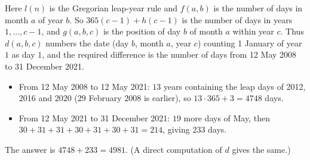 Here $l(n)$ is the Gregorian leap-year rule and $f(a,b)$ is the number of days in month $a$ of year $b$. So $365(c-1)+h(c-1)$ is the number of days in years $1,\dots,c-1$, and $g(a,b,c)$ is the position of day $b$ of month $a$ within year $c$. Thus $d(a,b,c)$ numbers the date (day $b$, month $a$, year $c$) counting 1 January of year $1$ as day $1$, and the required difference is the number of days from 12 May 2008 to 31 December 2021.
\begin{itemize}
\item From 12 May 2008 to 12 May 2021: $13$ years containing the leap days of 2012, 2016 and 2020 (29 February 2008 is earlier), so $13\cdot365+3=4748$ days.
\item From 12 May 2021 to 31 December 2021: $19$ more days of May, then $30+31+31+30+31+30+31=214$, giving $233$ days.
\end{itemize}
The answer is $4748+233=\boxed{4981}$. (A direct computation of $d$ gives the same.)
